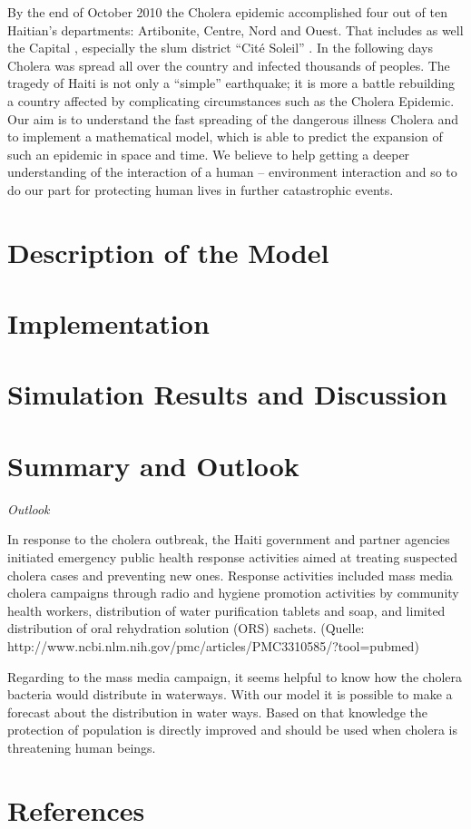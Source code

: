 \documentclass[11pt]{article}
\begin{document}
By the end of October 2010 the Cholera epidemic accomplished four out of ten Haitian’s departments: Artibonite, Centre, Nord and Ouest. That includes as well the Capital , especially the slum district “Cité Soleil” . In the following days Cholera was spread all over the country and infected thousands of peoples. The tragedy of Haiti is not only a “simple” earthquake; it is more a battle rebuilding a country affected by complicating circumstances such as the Cholera Epidemic. 
\newline
Our aim is to understand the fast spreading of the dangerous illness Cholera and to implement a mathematical model, which is able to predict the expansion of such an epidemic in space and time. We believe to help getting a deeper understanding of the interaction of a human – environment interaction and so to do our part for protecting human lives in further catastrophic events.


\section{Description of the Model}

\section{Implementation}

\section{Simulation Results and Discussion}

\section{Summary and Outlook}



\noindent\textit{Outlook}

In response to the cholera outbreak, the Haiti government and partner agencies initiated emergency public health response activities aimed at treating suspected cholera cases and preventing new ones. Response activities included mass media cholera campaigns through radio and hygiene promotion activities by community health workers, distribution of water purification tablets and soap, and limited distribution of oral rehydration solution (ORS) sachets. (Quelle: http://www.ncbi.nlm.nih.gov/pmc/articles/PMC3310585/?tool=pubmed)

Regarding to the mass media campaign, it seems helpful to know how  the cholera bacteria would distribute in waterways. With our model it is possible to make a forecast about the distribution in water ways. Based on that knowledge the protection of population is directly improved and should be used when cholera is threatening human beings.


\section{References}
\end{document}
